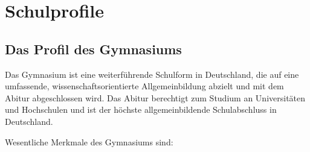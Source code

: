 \chapter{Schulprofile}

\section{Das Profil des  Gymnasiums}\label{Gymnasium} 

Das Gymnasium ist eine weiterf\"{u}hrende Schulform in Deutschland, die auf eine umfassende, wissenschaftsorientierte Allgemeinbildung abzielt und mit dem Abitur abgeschlossen wird. Das Abitur berechtigt zum Studium an Universit\"{a}ten und Hochschulen und ist der h\"{o}chste allgemeinbildende Schulabschluss in Deutschland.

Wesentliche Merkmale des Gymnasiums sind:

